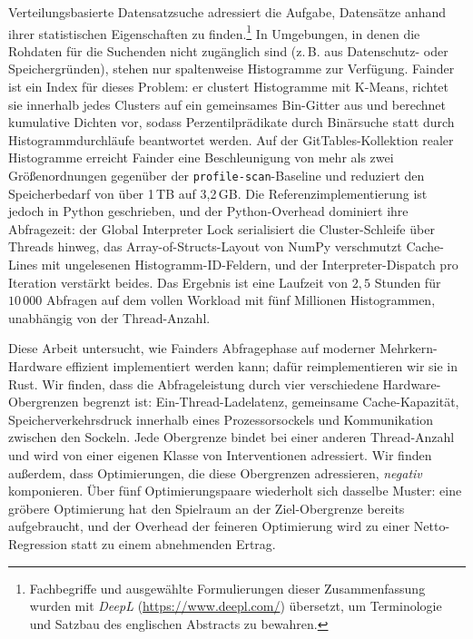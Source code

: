 Verteilungsbasierte Datensatzsuche adressiert die Aufgabe, Datens\"{a}tze anhand ihrer statistischen Eigenschaften zu finden.\footnote{Fachbegriffe und ausgew\"{a}hlte Formulierungen dieser Zusammenfassung wurden mit \emph{DeepL} (\url{https://www.deepl.com/}) \"{u}bersetzt, um Terminologie und Satzbau des englischen Abstracts zu bewahren.} In Umgebungen, in denen die Rohdaten f\"{u}r die Suchenden nicht zug\"{a}nglich sind (z.\,B. aus Datenschutz- oder Speichergr\"{u}nden), stehen nur spaltenweise Histogramme zur Verf\"{u}gung. Fainder~\cite{behme_2024} ist ein Index f\"{u}r dieses Problem: er clustert Histogramme mit K-Means, richtet sie innerhalb jedes Clusters auf ein gemeinsames Bin-Gitter aus und berechnet kumulative Dichten vor, sodass Perzentilpr\"{a}dikate durch Bin\"{a}rsuche statt durch Histogrammdurchl\"{a}ufe beantwortet werden. Auf der GitTables-Kollektion realer Histogramme erreicht Fainder eine Beschleunigung von mehr als zwei Gr\"{o}\ss{}enordnungen gegen\"{u}ber der \texttt{profile-scan}-Baseline und reduziert den Speicherbedarf von \"{u}ber 1\,TB auf 3{,}2\,GB. Die Referenzimplementierung ist jedoch in Python geschrieben, und der Python-Overhead dominiert ihre Abfragezeit: der Global Interpreter Lock serialisiert die Cluster-Schleife \"{u}ber Threads hinweg, das Array-of-Structs-Layout von NumPy verschmutzt Cache-Lines mit ungelesenen Histogramm-ID-Feldern, und der Interpreter-Dispatch pro Iteration verst\"{a}rkt beides. Das Ergebnis ist eine Laufzeit von $2{,}5$ Stunden f\"{u}r $10\,000$ Abfragen auf dem vollen Workload mit f\"{u}nf Millionen Histogrammen, unabh\"{a}ngig von der Thread-Anzahl.

Diese Arbeit untersucht, wie Fainders Abfragephase auf moderner Mehrkern-Hardware effizient implementiert werden kann; daf\"{u}r reimplementieren wir sie in Rust. Wir finden, dass die Abfrageleistung durch vier verschiedene Hardware-Obergrenzen begrenzt ist: Ein-Thread-Ladelatenz, gemeinsame Cache-Kapazit\"{a}t, Speicherverkehrsdruck innerhalb eines Prozessorsockels und Kommunikation zwischen den Sockeln. Jede Obergrenze bindet bei einer anderen Thread-Anzahl und wird von einer eigenen Klasse von Interventionen adressiert. Wir finden au\ss{}erdem, dass Optimierungen, die diese Obergrenzen adressieren, \emph{negativ} komponieren. \"{U}ber f\"{u}nf Optimierungspaare wiederholt sich dasselbe Muster: eine gr\"{o}bere Optimierung hat den Spielraum an der Ziel-Obergrenze bereits aufgebraucht, und der Overhead der feineren Optimierung wird zu einer Netto-Regression statt zu einem abnehmenden Ertrag.

